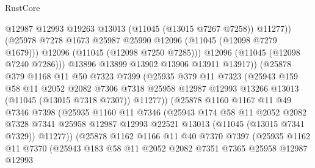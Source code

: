 \begin{lexlean}{RustCore}
\begin{coremodule}
                          @12987
                          @12993
                          @19263
                          @13013
                          (@11045 (@13015 @7267 @7258))
                          @11277))
                      (@25978 @7278 @1673 @25987 @25990 @12096 (@11045 (@12098 @7279 @1679)))
                      @12096
                      (@11045 (@12098 @7250 @7285)))
                    @12096
                    (@11045 (@12098 @7240 @7286)))
                  @13896
                  @13899
                  @13902
                  @13906
                  @13911
                  @13917))
              (@25878
                @379
                @1168
                @11
                @50
                @7323
                @7399
                (@25935
                  @379
                  @11
                  @7323
                  (@25943
                    @159
                    @58
                    @11
                    @2052
                    @2082
                    @7306
                    @7318
                    @25958
                    @12987
                    @12993
                    @13266
                    @13013
                    (@11045 (@13015 @7318 @7307))
                    @11277))
                (@25878
                  @1160
                  @1167
                  @11
                  @49
                  @7346
                  @7398
                  (@25935
                    @1160
                    @11
                    @7346
                    (@25943
                      @174
                      @58
                      @11
                      @2052
                      @2082
                      @7328
                      @7341
                      @25958
                      @12987
                      @12993
                      @22521
                      @13013
                      (@11045 (@13015 @7341 @7329))
                      @11277))
                  (@25878
                    @1162
                    @1166
                    @11
                    @40
                    @7370
                    @7397
                    (@25935
                      @1162
                      @11
                      @7370
                      (@25943
                        @183
                        @58
                        @11
                        @2052
                        @2082
                        @7351
                        @7365
                        @25958
                        @12987
                        @12993

\end{coremodule}
\end{lexlean}
